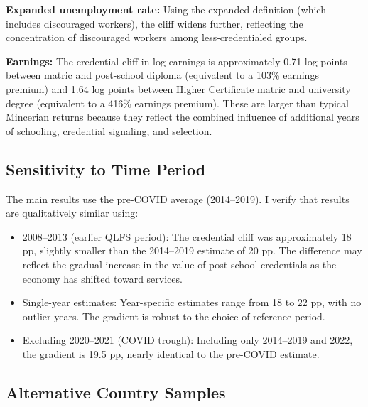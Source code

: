 \documentclass[12pt]{article}
\begin{document}
\textbf{Expanded unemployment rate:} Using the expanded definition (which includes discouraged workers), the cliff widens further, reflecting the concentration of discouraged workers among less-credentialed groups.

\textbf{Earnings:} The credential cliff in log earnings is approximately 0.71 log points between matric and post-school diploma (equivalent to a 103\% earnings premium) and 1.64 log points between Higher Certificate matric and university degree (equivalent to a 416\% earnings premium). These are larger than typical Mincerian returns because they reflect the combined influence of additional years of schooling, credential signaling, and selection.

\subsection{Sensitivity to Time Period}

The main results use the pre-COVID average (2014--2019). I verify that results are qualitatively similar using:
\begin{itemize}
    \item 2008--2013 (earlier QLFS period): The credential cliff was approximately 18 pp, slightly smaller than the 2014--2019 estimate of 20 pp. The difference may reflect the gradual increase in the value of post-school credentials as the economy has shifted toward services.
    \item Single-year estimates: Year-specific estimates range from 18 to 22 pp, with no outlier years. The gradient is robust to the choice of reference period.
    \item Excluding 2020--2021 (COVID trough): Including only 2014--2019 and 2022, the gradient is 19.5 pp, nearly identical to the pre-COVID estimate.
\end{itemize}

\subsection{Alternative Country Samples}
\end{document}
